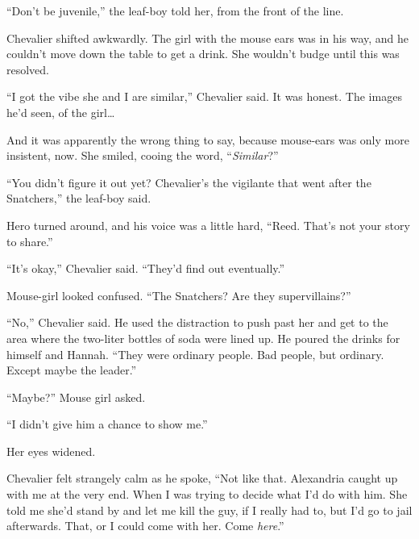 ``Don't be juvenile,'' the leaf-boy told her, from the front of the line.



Chevalier shifted awkwardly.  The girl with the mouse ears was in his way, and he couldn't move down the table to get a drink.  She wouldn't budge until this was resolved.



``I got the vibe she and I are similar,'' Chevalier said.  It was honest.  The images he'd seen, of the girl\ldots



And it was apparently the wrong thing to say, because mouse-ears was only more insistent, now.  She smiled, cooing the word, ``\emph{Similar}?''



``You didn't figure it out yet?  Chevalier's the vigilante that went after the Snatchers,'' the leaf-boy said.



Hero turned around, and his voice was a little hard, ``Reed.  That's not your story to share.''



``It's okay,'' Chevalier said.  ``They'd find out eventually.''



Mouse-girl looked confused.  ``The Snatchers?  Are they supervillains?''



``No,'' Chevalier said.  He used the distraction to push past her and get to the area where the two-liter bottles of soda were lined up.  He poured the drinks for himself and Hannah.  ``They were ordinary people.  Bad people, but ordinary.  Except maybe the leader.''



``Maybe?''  Mouse girl asked.



``I didn't give him a chance to show me.''



Her eyes widened.



Chevalier felt strangely calm as he spoke, ``Not like that.  Alexandria caught up with me at the very end.  When I was trying to decide what I'd do with him.  She told me she'd stand by and let me kill the guy, if I really had to, but I'd go to jail afterwards.  That, or I could come with her.  Come \emph{here}.''



